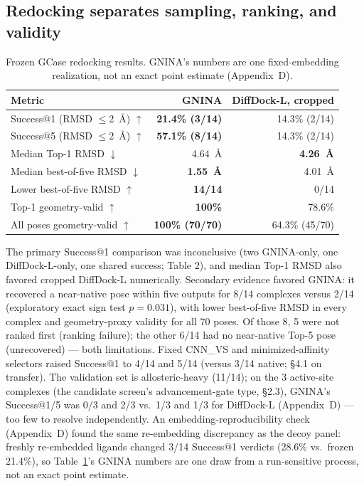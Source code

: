 \documentclass{article}
\begin{document}
\subsection{Redocking separates sampling, ranking, and validity}

\begin{table}[t]
  \caption{Frozen GCase redocking results. GNINA's numbers are one fixed-embedding realization, not an exact point estimate (Appendix~D).}
  \label{tab:redocking}
  \centering
  \footnotesize
  \begin{tabular}{lrr}
    \toprule
    Metric & GNINA & DiffDock-L, cropped \\
    \midrule
    Success@1 (RMSD $\leq$2~\AA) $\uparrow$ & \textbf{21.4\% (3/14)} & 14.3\% (2/14) \\
    Success@5 (RMSD $\leq$2~\AA) $\uparrow$ & \textbf{57.1\% (8/14)} & 14.3\% (2/14) \\
    Median Top-1 RMSD $\downarrow$ & 4.64~\AA & \textbf{4.26~\AA} \\
    Median best-of-five RMSD $\downarrow$ & \textbf{1.55~\AA} & 4.01~\AA \\
    Lower best-of-five RMSD $\uparrow$ & \textbf{14/14} & 0/14 \\
    Top-1 geometry-valid $\uparrow$ & \textbf{100\%} & 78.6\% \\
    All poses geometry-valid $\uparrow$ & \textbf{100\% (70/70)} & 64.3\% (45/70) \\
    \bottomrule
  \end{tabular}
\end{table}

The primary Success@1 comparison was inconclusive (two GNINA-only, one DiffDock-L-only, one shared success; Table 2), and median Top-1 RMSD also favored cropped DiffDock-L numerically. Secondary evidence favored GNINA: it recovered a near-native pose within five outputs for 8/14 complexes versus 2/14 (exploratory exact sign test $p=0.031$), with lower best-of-five RMSD in every complex and geometry-proxy validity for all 70 poses. Of those 8, 5 were not ranked first (ranking failure); the other 6/14 had no near-native Top-5 pose (unrecovered) --- both limitations. Fixed CNN\_VS and minimized-affinity selectors raised Success@1 to 4/14 and 5/14 (versus 3/14 native; \S4.1 on transfer). The validation set is allosteric-heavy (11/14); on the 3 active-site complexes (the candidate screen's advancement-gate type, \S2.3), GNINA's Success@1/5 was 0/3 and 2/3 vs.\ 1/3 and 1/3 for DiffDock-L (Appendix~D) --- too few to resolve independently. An embedding-reproducibility check (Appendix~D) found the same re-embedding discrepancy as the decoy panel: freshly re-embedded ligands changed 3/14 Success@1 verdicts (28.6\% vs.\ frozen 21.4\%), so Table~\ref{tab:redocking}'s GNINA numbers are one draw from a run-sensitive process, not an exact point estimate.
\end{document}
